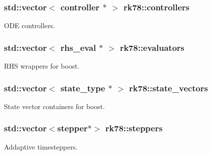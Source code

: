 \subsubsection[{\texorpdfstring{controllers}{controllers}}]{\setlength{\rightskip}{0pt plus 5cm}std\+::vector$<$ {\bf controller} $\ast$ $>$ rk78\+::controllers}\hypertarget{namespacerk78_a7f7ff39cbfddcdc41eb68fd64749997f}{}\label{namespacerk78_a7f7ff39cbfddcdc41eb68fd64749997f}


O\+DE controllers. 

\subsubsection[{\texorpdfstring{evaluators}{evaluators}}]{\setlength{\rightskip}{0pt plus 5cm}std\+::vector$<$ {\bf rhs\+\_\+eval} $\ast$ $>$ rk78\+::evaluators}\hypertarget{namespacerk78_a83c99482273a838fc2d7305a362cae21}{}\label{namespacerk78_a83c99482273a838fc2d7305a362cae21}


R\+HS wrappers for boost. 

\subsubsection[{\texorpdfstring{state\+\_\+vectors}{state_vectors}}]{\setlength{\rightskip}{0pt plus 5cm}std\+::vector$<$ {\bf state\+\_\+type} $\ast$ $>$ rk78\+::state\+\_\+vectors}\hypertarget{namespacerk78_a96d3a36cb53b773f2aa1a538ba9bdad1}{}\label{namespacerk78_a96d3a36cb53b773f2aa1a538ba9bdad1}


State vector containers for boost. 

\subsubsection[{\texorpdfstring{steppers}{steppers}}]{\setlength{\rightskip}{0pt plus 5cm}std\+::vector$<${\bf stepper}$\ast$$>$ rk78\+::steppers}\hypertarget{namespacerk78_a15830d3d7a5bea311980fcb1ccec9c91}{}\label{namespacerk78_a15830d3d7a5bea311980fcb1ccec9c91}


Addaptive timesteppers. 

